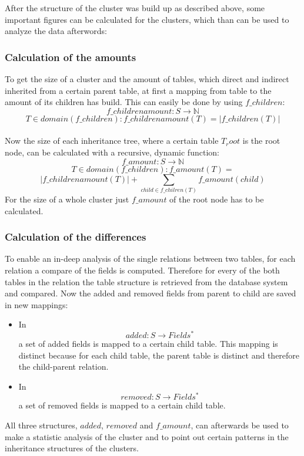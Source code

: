 \documentclass[10pt, journal, twocolumn]{IEEEtran}
\begin{document}
After the structure of the cluster was build up as described above, some important figures can be calculated for the clusters, which than can be used to analyze the data afterwords:
\\\subsubsection{Calculation of the amounts}
To get the size of a cluster and the amount of tables, which direct and indirect inherited from a certain parent table, at first a mapping from table to the amount of its children has build. This can easily be done by using $f\_children$: $$ f\_childrenamount: S \rightarrow \mathbb{N} $$ $$T \in domain(f\_children): f\_childrenamount(T) = | f\_children(T) | $$\\
Now the size of each inheritance tree, where a certain table $T_root$ is the root node, can be calculated with a recursive, dynamic function:
$$ f\_amount: S \rightarrow \mathbb{N} $$ $$T \in domain(f\_children): f\_amount(T) = $$ $$| f\_childrenamount(T) | + \sum_{child \in f\_chilren(T)}{f\_amount(child)} $$ For the size of a whole cluster just $f\_amount$ of the root node has to be calculated.
\\\subsubsection{Calculation of the differences}
To enable an in-deep analysis of the single relations between two tables, for each relation a compare of the fields is computed. Therefore for every of the both tables in the relation the table structure is retrieved from the database system and compared. Now the added and removed fields from parent to child are saved in new mappings:
\begin{itemize}
\item In $$added: S \rightarrow Fields^*$$ a set of added fields is mapped to a certain child table. This mapping is distinct because for each child table, the parent table is distinct and therefore the child-parent relation.
\item In $$removed: S \rightarrow Fields^*$$ a set of removed fields is mapped to a certain child table. 
\end{itemize}
All three structures, $added$, $removed$ and $f\_amount$, can afterwards be used to make a statistic analysis of the cluster and to point out certain patterns in the inheritance structures of the clusters.
\end{document}
